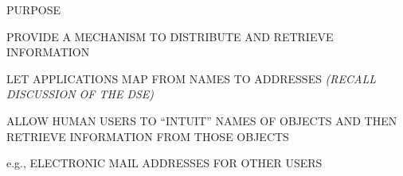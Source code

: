 %




\begin{bwslide}

\begin{nrtc}
\item	PURPOSE
	\begin{nrtc}
	\item	PROVIDE A MECHANISM TO DISTRIBUTE AND RETRIEVE INFORMATION
	\item	LET APPLICATIONS MAP FROM NAMES TO ADDRESSES {\em (RECALL
		DISCUSSION OF THE DSE)}
	\item	ALLOW HUMAN USERS TO ``INTUIT'' NAMES OF OBJECTS AND THEN
		RETRIEVE INFORMATION FROM THOSE OBJECTS
		\begin{nrtc}
		\item e.g., ELECTRONIC MAIL ADDRESSES FOR OTHER USERS
		\end{nrtc}
	\end{nrtc}
\end{nrtc}
\end{bwslide}



